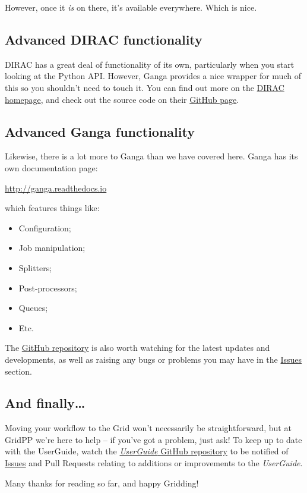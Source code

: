 However, once it \emph{is} on there, it's available everywhere. Which is
nice.

\subsection{Advanced DIRAC functionality}
\label{advanced-dirac-functionality}
DIRAC has a great deal of functionality of its own, particularly when
you start looking at the Python API. However, Ganga provides a nice
wrapper for much of this so you shouldn't need to touch it. You can find
out more on the \href{http://diracgrid.org/}{DIRAC homepage}, and check
out the source code on their \href{https://github.com/DIRACGrid}{GitHub
page}.

\subsection{Advanced Ganga functionality}
\label{advanced-ganga-functionality}
Likewise, there is a lot more to Ganga than we have covered here. Ganga
has its own documentation page:

\url{http://ganga.readthedocs.io}

which features things like:

\begin{itemize}
\tightlist
\item Configuration;
\item Job manipulation;
\item Splitters;
\item Post-processors;
\item Queues;
\item Etc.
\end{itemize}

The \href{https://github.com/ganga-devs/ganga}{GitHub repository} is
also worth watching for the latest updates and developments, as well as
raising any bugs or problems you may have in the
\href{https://github.com/ganga-devs/ganga/issues}{Issues} section.

\subsection{And finally\ldots{}}\label{and-finally}

Moving your workflow to the Grid won't necessarily be straightforward,
but at GridPP we're here to help -- if you've got a problem, just ask!
To keep up to date with the
UserGuide, watch the
\href{https://github.com/gridpp/user-guides}{\emph{UserGuide} GitHub
repository} to be notified of
\href{https://github.com/gridpp/user-guides/issues}{Issues} and Pull
Requests relating to additions or improvements to the \emph{UserGuide}.

Many thanks for reading so far, and happy Gridding!
